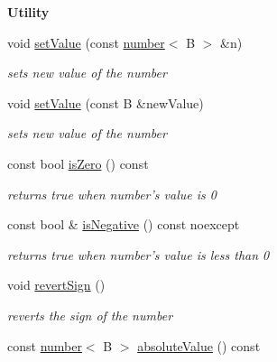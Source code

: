 \begin{Indent}{\bf Utility}\par
\begin{DoxyCompactItemize}
\item 
void \hyperlink{classcjr_1_1number_a14c7b4e829ee04a405f149db57c00195}{set\-Value} (const \hyperlink{classcjr_1_1number}{number}$<$ B $>$ \&n)
\begin{DoxyCompactList}\small\item\em sets new value of the number \end{DoxyCompactList}\item 
void \hyperlink{classcjr_1_1number_a66c1ad13348c078cbf75d73def0aab9e}{set\-Value} (const B \&new\-Value)
\begin{DoxyCompactList}\small\item\em sets new value of the number \end{DoxyCompactList}\item 
\hypertarget{classcjr_1_1number_a456c3bd567b3603b9985d6baa73f8641}{const bool \hyperlink{classcjr_1_1number_a456c3bd567b3603b9985d6baa73f8641}{is\-Zero} () const }\label{classcjr_1_1number_a456c3bd567b3603b9985d6baa73f8641}

\begin{DoxyCompactList}\small\item\em returns true when number's value is 0 \end{DoxyCompactList}\item 
\hypertarget{classcjr_1_1number_a08274244f62ed97d98464046697cb800}{const bool \& \hyperlink{classcjr_1_1number_a08274244f62ed97d98464046697cb800}{is\-Negative} () const noexcept}\label{classcjr_1_1number_a08274244f62ed97d98464046697cb800}

\begin{DoxyCompactList}\small\item\em returns true when number's value is less than 0 \end{DoxyCompactList}\item 
\hypertarget{classcjr_1_1number_a153b7f8c8223b47846e2c64c7bdccfdb}{void \hyperlink{classcjr_1_1number_a153b7f8c8223b47846e2c64c7bdccfdb}{revert\-Sign} ()}\label{classcjr_1_1number_a153b7f8c8223b47846e2c64c7bdccfdb}

\begin{DoxyCompactList}\small\item\em reverts the sign of the number \end{DoxyCompactList}\item 
\hypertarget{classcjr_1_1number_a0a5c6272d8c076e1b1884530bcedee9b}{const \hyperlink{classcjr_1_1number}{number}$<$ B $>$ \hyperlink{classcjr_1_1number_a0a5c6272d8c076e1b1884530bcedee9b}{absolute\-Value} () const }\label{classcjr_1_1number_a0a5c6272d8c076e1b1884530bcedee9b}


\end{DoxyCompactItemize}
\end{Indent}
